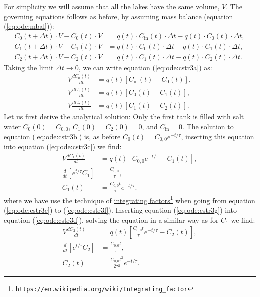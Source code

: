 \documentclass[graybox,sectrefs,envcountresetchap,open=right,final]{svmonodo}
\begin{document}
For simplicity we will assume that all the lakes have the same volume, $V$. The governing equations follows
as before, by assuming mass balance (equation (\ref{eq:ode:mbal})):
\begin{align}
C_0(t+\Delta t)\cdot V - C_0(t)\cdot V &= q(t)\cdot C_\text{in}(t)\cdot \Delta t - q(t)\cdot C_0(t)\cdot \Delta t,\nonumber\\ 
C_1(t+\Delta t)\cdot V - C_1(t)\cdot V &= q(t)\cdot C_0(t)\cdot \Delta t - q(t)\cdot C_1(t)\cdot \Delta t,\nonumber\\ 
C_2(t+\Delta t)\cdot V - C_2(t)\cdot V &= q(t)\cdot C_1(t)\cdot \Delta t - q(t)\cdot C_2(t)\cdot \Delta t.\label{eq:ode:cstr3a}
\end{align}
Taking the limit $\Delta t\to 0$, we can write equation (\ref{eq:ode:cstr3a}) as:
\begin{align}
V\frac{dC_0(t)}{dt} &= q(t)\left[C_\text{in}(t) - C_0(t)\right],\label{eq:ode:cstr3b}\\ 
V\frac{dC_1(t)}{dt} &= q(t)\left[C_0(t) - C_1(t)\right],\label{eq:ode:cstr3c}\\ 
V\frac{dC_2(t)}{dt} &= q(t)\left[C_1(t) - C_2(t)\right].\label{eq:ode:cstr3d}
\end{align}
Let us first derive the analytical solution: Only the first tank is filled with salt water $C_0(0)=C_{0,0}$, $C_1(0)=C_2(0)=0$, and $C_\text{in}=0$. 
The solution to equation (\ref{eq:ode:cstr3b}) is, as before $C_0(t)=C_{0,0}e^{-t/\tau}$, inserting this equation into equation (\ref{eq:ode:cstr3c}) we find:
\begin{align}
V\frac{dC_1(t)}{dt} &= q(t)\left[C_{0,0}e^{-t/\tau} - C_1(t)\right]\label{eq:ode:cstr3e},\\ 
\frac{d}{dt}\left[e^{t/\tau}C_1\right]&= \frac{C_{0,0}}{\tau}\label{eq:ode:cstr3f},\\ 
C_1(t)&=\frac{C_{0,0}t}{\tau}e^{-t/\tau}\label{eq:ode:cstr3g}.
\end{align}
where we have use the technique of \href{{https://en.wikipedia.org/wiki/Integrating_factor}}{integrating factors}\footnote{\texttt{https://en.wikipedia.org/wiki/Integrating\_factor}} when going from equation (\ref{eq:ode:cstr3e}) to (\ref{eq:ode:cstr3f}). 
Inserting equation (\ref{eq:ode:cstr3g}) into equation (\ref{eq:ode:cstr3d}), solving the equation in a similar way as for $C_1$ we find:
\begin{align}
V\frac{dC_2(t)}{dt} &= q(t)\left[\frac{C_{0,0}t}{\tau}e^{-t/\tau} - C_2(t)\right],\label{eq:ode:cstr3h}\\ 
\frac{d}{dt}\left[e^{t/\tau}C_2\right]&= \frac{C_{0,0}t}{\tau},\label{eq:ode:cstr3i}\\ 
C_2(t)&=\frac{C_{0,0}t^2}{2\tau^2}e^{-t/\tau}.\label{eq:ode:cstr3j}
\end{align}
\end{document}
